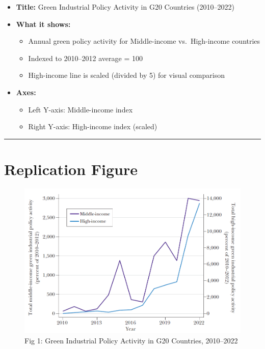 \documentclass[
  letterpaper,
  DIV=11,
  numbers=noendperiod]{scrartcl}
\providecommand{\tightlist}{%
  \setlength{\itemsep}{0pt}\setlength{\parskip}{0pt}}
\begin{document}
\begin{itemize}
\tightlist
\item
  \textbf{Title:} Green Industrial Policy Activity in G20 Countries
  (2010--2022)
\item
  \textbf{What it shows:}

  \begin{itemize}
  \tightlist
  \item
    Annual green policy activity for Middle-income vs.~High-income
    countries
  \item
    Indexed to 2010--2012 average = 100
  \item
    High-income line is scaled (divided by 5) for visual comparison
  \end{itemize}
\item
  \textbf{Axes:}

  \begin{itemize}
  \tightlist
  \item
    Left Y-axis: Middle-income index\\
  \item
    Right Y-axis: High-income index (scaled)
  \end{itemize}
\end{itemize}

\begin{center}\rule{0.5\linewidth}{0.5pt}\end{center}

\section{Replication Figure}\label{replication-figure}

\begin{figure}[H]

{\centering \includegraphics[width=1\linewidth,height=\textheight,keepaspectratio]{index_files/mediabag/figure_1.png}

}

\caption{Fig 1: Green Industrial Policy Activity in G20 Countries,
2010--2022}

\end{figure}%
\end{document}
